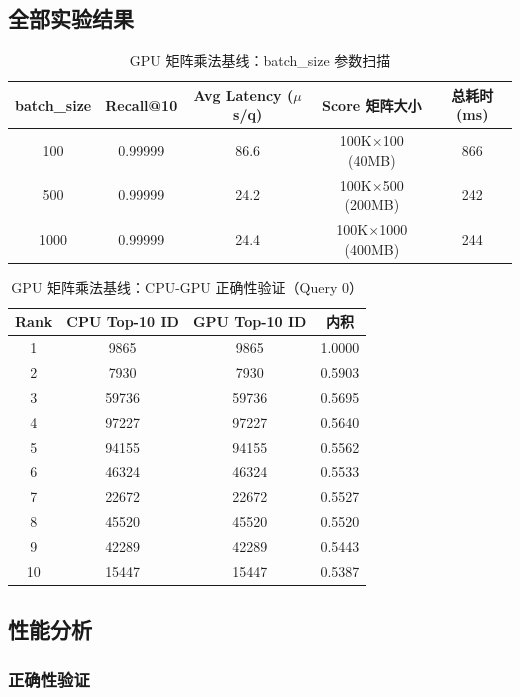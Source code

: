 \documentclass[UTF8,a4paper,10pt]{ctexart}
\begin{document}
\subsection{全部实验结果}

\begin{table}[H]
\centering
\caption{GPU 矩阵乘法基线：batch\_size 参数扫描}
\label{tab:matmul-all}
\begin{tabular}{ccccc}
\toprule
batch\_size & Recall@10 & Avg Latency ($\mu$s/q) & Score 矩阵大小 & 总耗时 (ms) \\
\midrule
100  & 0.99999 & 86.6 & 100K$\times$100 (40MB) & 866 \\
500  & 0.99999 & 24.2 & 100K$\times$500 (200MB) & 242 \\
1000 & 0.99999 & 24.4 & 100K$\times$1000 (400MB) & 244 \\
\bottomrule
\end{tabular}
\end{table}

\begin{table}[H]
\centering
\caption{GPU 矩阵乘法基线：CPU-GPU 正确性验证（Query 0）}
\label{tab:matmul-correctness}
\begin{tabular}{cccc}
\toprule
Rank & CPU Top-10 ID & GPU Top-10 ID & 内积 \\
\midrule
1 & 9865 & 9865 & 1.0000 \\
2 & 7930 & 7930 & 0.5903 \\
3 & 59736 & 59736 & 0.5695 \\
4 & 97227 & 97227 & 0.5640 \\
5 & 94155 & 94155 & 0.5562 \\
6 & 46324 & 46324 & 0.5533 \\
7 & 22672 & 22672 & 0.5527 \\
8 & 45520 & 45520 & 0.5520 \\
9 & 42289 & 42289 & 0.5443 \\
10 & 15447 & 15447 & 0.5387 \\
\bottomrule
\end{tabular}
\end{table}

\subsection{性能分析}

\subsubsection{正确性验证}
\end{document}
